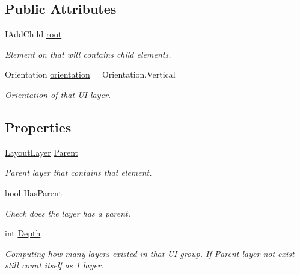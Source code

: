 \subsection*{Public Attributes}
\begin{DoxyCompactItemize}
\item 
I\+Add\+Child \mbox{\hyperlink{class_wpf_handler_1_1_u_i_1_1_auto_layout_1_1_layout_layer_a33a0fb101d691fe36c813f7ed8a101e3}{root}}
\begin{DoxyCompactList}\small\item\em Element on that will contains child elements. \end{DoxyCompactList}\item 
Orientation \mbox{\hyperlink{class_wpf_handler_1_1_u_i_1_1_auto_layout_1_1_layout_layer_aaa8c38d388802ad0cc19d10041fce973}{orientation}} = Orientation.\+Vertical
\begin{DoxyCompactList}\small\item\em Orientation of that \mbox{\hyperlink{namespace_wpf_handler_1_1_u_i}{UI}} layer. \end{DoxyCompactList}\end{DoxyCompactItemize}
\subsection*{Properties}
\begin{DoxyCompactItemize}
\item 
\mbox{\hyperlink{class_wpf_handler_1_1_u_i_1_1_auto_layout_1_1_layout_layer}{Layout\+Layer}} \mbox{\hyperlink{class_wpf_handler_1_1_u_i_1_1_auto_layout_1_1_layout_layer_a6c500688328621ecf68522d0660338e0}{Parent}}
\begin{DoxyCompactList}\small\item\em Parent layer that contains that element. \end{DoxyCompactList}\item 
bool \mbox{\hyperlink{class_wpf_handler_1_1_u_i_1_1_auto_layout_1_1_layout_layer_a5ea746a7bc23b5db06caaaf753ec4507}{Has\+Parent}}
\begin{DoxyCompactList}\small\item\em Check does the layer has a parent. \end{DoxyCompactList}\item 
int \mbox{\hyperlink{class_wpf_handler_1_1_u_i_1_1_auto_layout_1_1_layout_layer_a3c200abd4df57c0090471f255607557f}{Depth}}
\begin{DoxyCompactList}\small\item\em Computing how many layers existed in that \mbox{\hyperlink{namespace_wpf_handler_1_1_u_i}{UI}} group. If Parent layer not exist still count itself as 1 layer. \end{DoxyCompactList}\end{DoxyCompactItemize}
